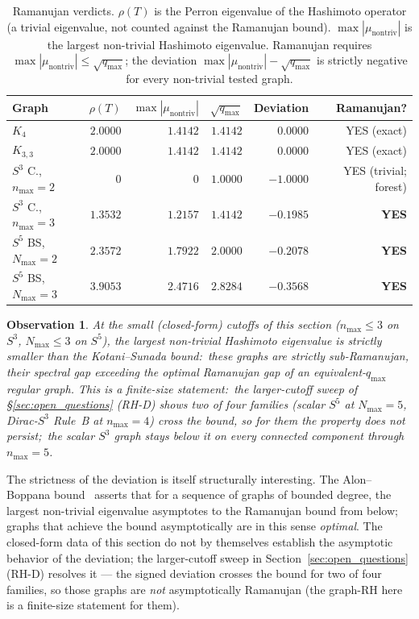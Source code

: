 \documentclass[11pt]{article}
\newtheorem{observation}{Observation}
\begin{document}
\begin{table}[h]
\centering
\begin{tabular}{lrrrrr}
\toprule
Graph & $\rho(T)$ & $\max|\mu_{\mathrm{nontriv}}|$ & $\sqrt{q_{\max}}$ & Deviation & Ramanujan? \\
\midrule
$K_4$  & $2.0000$ & $1.4142$ & $1.4142$ & $\phantom{-}0.0000$ & YES (exact) \\
$K_{3,3}$ & $2.0000$ & $1.4142$ & $1.4142$ & $\phantom{-}0.0000$ & YES (exact) \\
$S^3$ C., $n_{\max}=2$ & $0$ & $0$ & $1.0000$ & $-1.0000$ & YES (trivial; forest) \\
$S^3$ C., $n_{\max}=3$ & $1.3532$ & $1.2157$ & $1.4142$ & $-0.1985$ & \textbf{YES} \\
$S^5$ BS, $N_{\max}=2$ & $2.3572$ & $1.7922$ & $2.0000$ & $-0.2078$ & \textbf{YES} \\
$S^5$ BS, $N_{\max}=3$ & $3.9053$ & $2.4716$ & $2.8284$ & $-0.3568$ & \textbf{YES} \\
\bottomrule
\end{tabular}
\caption{Ramanujan verdicts.  $\rho(T)$ is the Perron eigenvalue of the
Hashimoto operator (a trivial eigenvalue, not counted against the
Ramanujan bound).  $\max|\mu_{\mathrm{nontriv}}|$ is the largest
non-trivial Hashimoto eigenvalue.  Ramanujan requires
$\max|\mu_{\mathrm{nontriv}}|\le\sqrt{q_{\max}}$; the deviation
$\max|\mu_{\mathrm{nontriv}}|-\sqrt{q_{\max}}$ is strictly negative
for every non-trivial tested graph.}
\label{tab:ramanujan}
\end{table}

\begin{observation}
\label{obs:ramanujan}
At the small (closed-form) cutoffs of this section ($n_{\max} \le 3$ on
$S^3$, $N_{\max} \le 3$ on $S^5$), the largest non-trivial
Hashimoto eigenvalue is strictly smaller than the Kotani--Sunada bound:\
these graphs are strictly sub-Ramanujan, their spectral gap exceeding
the optimal Ramanujan gap of an equivalent-$q_{\max}$ regular graph.
This is a \emph{finite-size} statement:\ the larger-cutoff sweep of
\S\ref{sec:open_questions} (RH-D) shows two of four families
(scalar $S^5$ at $N_{\max} = 5$, Dirac-$S^3$ Rule~B at $n_{\max} = 4$)
\emph{cross} the bound, so for them the property does not persist;\
the scalar $S^3$ graph stays below it on every connected component
through $n_{\max} = 5$.
\end{observation}

The strictness of the deviation is itself structurally interesting.
The Alon--Boppana bound~\cite{alon1986} asserts that for a sequence of
graphs of bounded degree, the largest non-trivial eigenvalue
asymptotes to the Ramanujan bound from below; graphs that achieve the
bound asymptotically are in this sense \emph{optimal}.  The closed-form
data of this section do not by themselves establish the asymptotic
behavior of the deviation; the larger-cutoff sweep in
Section~\ref{sec:open_questions} (RH-D) resolves it --- the signed
deviation crosses the bound for two of four families, so those graphs
are \emph{not} asymptotically Ramanujan (the graph-RH here is a
finite-size statement for them).
\end{document}
